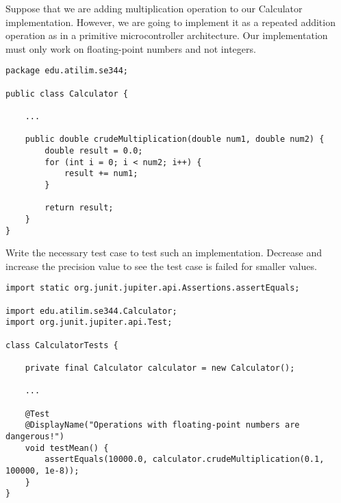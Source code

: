 \begin{exercise}
    Suppose that we are adding multiplication operation to our Calculator implementation. However, we are going to implement it as a repeated addition operation as in a primitive microcontroller architecture. Our implementation must only work on floating-point numbers and not integers.
    
    \begin{lstlisting}[caption={An implementation for multiplication operation with a loop.}]
package edu.atilim.se344;

public class Calculator {
    
    ...
    
    public double crudeMultiplication(double num1, double num2) {
        double result = 0.0;
        for (int i = 0; i < num2; i++) {
            result += num1;
        }
        
        return result;
    }
}
    \end{lstlisting}
    
    Write the necessary test case to test such an implementation. Decrease and increase the precision value to see the test case is failed for smaller values.
\end{exercise}

\begin{solution}
        \begin{lstlisting}[caption={A floating-point assert statement with precision.}]
import static org.junit.jupiter.api.Assertions.assertEquals;

import edu.atilim.se344.Calculator;
import org.junit.jupiter.api.Test;

class CalculatorTests {

    private final Calculator calculator = new Calculator();

    ...
    
    @Test
    @DisplayName("Operations with floating-point numbers are dangerous!")
    void testMean() {
        assertEquals(10000.0, calculator.crudeMultiplication(0.1, 100000, 1e-8));
    }
}
    \end{lstlisting}
\end{solution}